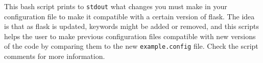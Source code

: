 \documentclass[12pt]{book} %
\begin{document}
This {\sc bash} script prints to {\tt stdout} what changes you must make in your 
configuration file to make it compatible with a certain version of {\sc flask}. 
The idea is that as {\sc flask} is updated, keywords might be added or removed, 
and this scripts helps the user to make previous configuration files compatible 
with new versions of the code by comparing them to the new {\tt example.config} 
file. Check the script comments for more information.   



\end{document}

